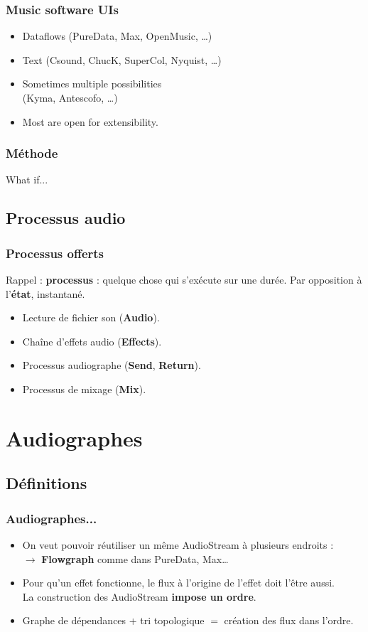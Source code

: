 \documentclass[draft]{beamer}
\begin{document}
\begin{frame}
	\frametitle{Music software UIs}    
	\Large
	\begin{itemize}
		\item<1-> Dataflows (PureData, Max, OpenMusic, \dots)
		\item<2-> Text (Csound, ChucK, SuperCol, Nyquist, \dots)
		\item<3-> Sometimes multiple possibilities~\\ (Kyma, Antescofo, \dots)
        \item<3-> Most are open for extensibility.
	\end{itemize}
\end{frame}

\begin{frame}
	\frametitle{Méthode}    
	\Large
    \centering
    What if...
\end{frame}

\subsection{Processus audio}
\begin{frame}	
	\frametitle{Processus offerts}    
	\Large
	Rappel : \textbf{processus} : quelque chose qui s'exécute sur une durée. Par opposition à l'\textbf{état}, instantané.
	\begin{itemize}
		\item Lecture de fichier son (\textbf{Audio}).
		\item Chaîne d'effets audio (\textbf{Effects}).
		\item Processus audiographe (\textbf{Send}, \textbf{Return}).
		\item Processus de mixage (\textbf{Mix}).
	\end{itemize}    
\end{frame}

\section{Audiographes}
\subsection{Définitions}
\begin{frame}
	\frametitle{Audiographes...}    
	\Large
	\begin{itemize}
		\item On veut pouvoir réutiliser un même AudioStream à plusieurs endroits :  \\ $\rightarrow$ \textbf{Flowgraph} comme dans PureData, Max\dots
		\item Pour qu'un effet fonctionne, le flux à l'origine de l'effet doit l'être aussi.~\\
		La construction des AudioStream \textbf{impose un ordre}.
		\item Graphe de dépendances + tri topologique $=$ création des flux dans l'ordre.
	\end{itemize}    
\end{frame}
\end{document}
